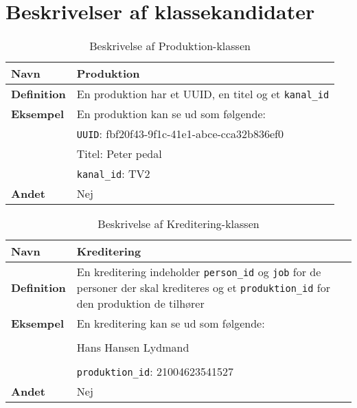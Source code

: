 \section{Beskrivelser af klassekandidater}


\begin{table}[H]
    \begin{tabularx}{\textwidth}{|>{\RaggedRight}p{3cm}|>{\RaggedRight}X|}
        \hline
        \textbf{Navn} & Produktion\\
        \hline
        \textbf{Definition} &  En produktion har et UUID, en titel og et \texttt{kanal\_id}\\
        \hline
        \textbf{Eksempel} & En produktion kan se ud som følgende:\\
                          & \texttt{UUID}: fbf20f43-9f1c-41e1-abce-cca32b836ef0 \\
                          & Titel: Peter pedal \\
                          & \texttt{kanal\_id}: TV2 \\
        \hline
        \textbf{Andet} & Nej\\
        \hline
    \end{tabularx}
    \caption{Beskrivelse af Produktion-klassen}
    \label{tab:production_class_description}
\end{table}

\begin{table}[H]
    \begin{tabularx}{\textwidth}{|>{\RaggedRight}p{3cm}|>{\RaggedRight}X|}
        \hline
        \textbf{Navn} & Kreditering\\
        \hline
        \textbf{Definition} & En kreditering indeholder \texttt{person\_id} og \texttt{job} for de personer der skal krediteres og et \texttt{produktion\_id} for den produktion de tilhører \\
        \hline
        \textbf{Eksempel} & En kreditering kan se ud som følgende: \\
                          & \\
                          & Hans Hansen \quad \quad \quad \quad Lydmand\\
                          & \\
                          & \texttt{produktion\_id}: 21004623541527 \\
        \hline
        \textbf{Andet} & Nej\\
        \hline
    \end{tabularx}
    \caption{Beskrivelse af Kreditering-klassen}
    \label{tab:credit_class_description}
\end{table}


